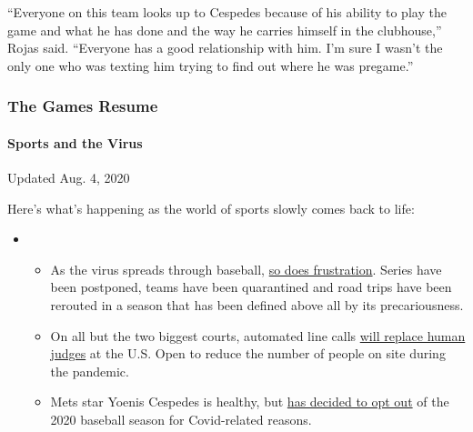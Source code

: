 ``Everyone on this team looks up to Cespedes because of his ability to
play the game and what he has done and the way he carries himself in the
clubhouse,'' Rojas said. ``Everyone has a good relationship with him.
I'm sure I wasn't the only one who was texting him trying to find out
where he was pregame.''

\hypertarget{the-games-resume}{%
\subsubsection{The Games Resume}\label{the-games-resume}}

\hypertarget{sports-and-the-virus}{%
\paragraph{Sports and the Virus}\label{sports-and-the-virus}}

Updated Aug. 4, 2020

Here's what's happening as the world of sports slowly comes back to
life:

\begin{itemize}
\item
  \begin{itemize}
  \tightlist
  \item
    As the virus spreads through baseball,
    \href{https://www.nytimes.com/2020/08/03/sports/baseball/mlb-coronavirus-outbreak.html?action=click\&pgtype=Article\&state=default\&region=MAIN_CONTENT_2\&context=storylines_keepup}{so
    does frustration}. Series have been postponed, teams have been
    quarantined and road trips have been rerouted in a season that has
    been defined above all by its precariousness.
  \item
    On all but the two biggest courts, automated line calls
    \href{https://www.nytimes.com/2020/08/03/sports/tennis/us-open-hawkeye-line-judges.html?action=click\&pgtype=Article\&state=default\&region=MAIN_CONTENT_2\&context=storylines_keepup}{will
    replace human judges} at the U.S. Open to reduce the number of
    people on site during the pandemic.
  \item
    Mets star Yoenis Cespedes is healthy, but
    \href{https://www.nytimes.com/2020/08/02/sports/baseball/Yoenis-cespedes-opt-out-rule.html?action=click\&pgtype=Article\&state=default\&region=MAIN_CONTENT_2\&context=storylines_keepup}{has
    decided to opt out} of the 2020 baseball season for Covid-related
    reasons.
  \end{itemize}
\end{itemize}

